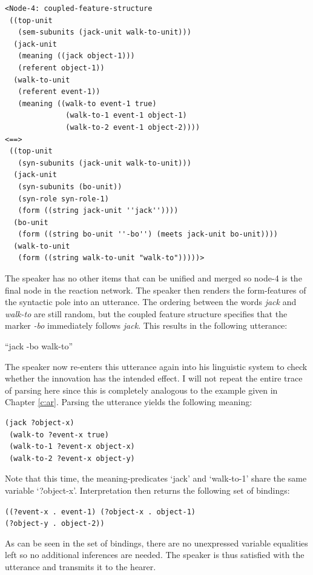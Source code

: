 \ea
\begin{lstlisting}
<Node-4: coupled-feature-structure
 ((top-unit
   (sem-subunits (jack-unit walk-to-unit)))
  (jack-unit
   (meaning ((jack object-1)))
   (referent object-1))
  (walk-to-unit
   (referent event-1))
   (meaning ((walk-to event-1 true)
              (walk-to-1 event-1 object-1)
              (walk-to-2 event-1 object-2))))
<==>
 ((top-unit
   (syn-subunits (jack-unit walk-to-unit)))
  (jack-unit
   (syn-subunits (bo-unit))
   (syn-role syn-role-1)
   (form ((string jack-unit ''jack''))))
  (bo-unit
   (form ((string bo-unit ''-bo'') (meets jack-unit bo-unit))))
  (walk-to-unit
   (form ((string walk-to-unit "walk-to")))))>
\end{lstlisting}
\z


The speaker has no other items that can be unified and merged so node-4 is the final node in the reaction network. The speaker then renders the form-features of the syntactic pole into an utterance. The ordering between the words {\em jack} and {\em walk-to} are still random, but the coupled feature structure specifies that the marker {\em -bo} immediately follows {\em jack}. This results in the following utterance:

\ea
``jack -bo walk-to''
\z

The speaker now re-enters this utterance again into his linguistic system to check whether the innovation has the intended effect. I will not repeat the entire trace of parsing here since this is completely analogous to the example given in Chapter \ref{c:ar}. Parsing the utterance yields the following meaning:

\ea
\begin{lstlisting}
(jack ?object-x)
 (walk-to ?event-x true)
 (walk-to-1 ?event-x object-x)
 (walk-to-2 ?event-x object-y)
\end{lstlisting}
\z

Note that this time, the meaning-predicates `jack' and `walk-to-1' share the same variable `?object-x'. Interpretation then returns the following set of bindings:

\ea
{\footnotesize\tt{((?event-x . event-1) (?object-x . object-1) \\ \hspace{3,3mm}(?object-y . object-2))}}
\z

As can be seen in the set of bindings, there are no unexpressed variable equalities left so no additional inferences are needed. The speaker is thus satisfied with the utterance and transmits it to the hearer.


